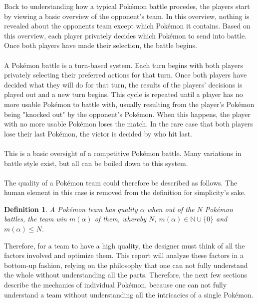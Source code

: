 \documentclass{article}
\newtheorem{definition}{Definition}
\begin{document}
Back to understanding how a typical Pok\'emon battle procedes, the players start by viewing a basic overview of the opponent's team. In this overview, nothing is revealed about the opponents team except which Pok\'emon it contains. Based on this overview, each player privately decides which Pok\'emon to send into battle. Once both players have made their selection, the battle begins.\\\\
A Pok\'emon battle is a turn-based system. Each turn begins with both players privately selecting their preferred actions for that turn. Once both players have decided what they will do for that turn, the results of the players' decisions is played out and a new turn begins. This cycle is repeated until a player has no more usable Pok\'emon to battle with, usually resulting from the player's Pok\'emon being "knocked out" by the opponent's Pok\'emon. When this happens, the player with no more usable Pok\'emon loses the match. In the rare case that both players lose their last Pok\'emon, the victor is decided by who hit last.\\\\
This is a basic oversight of a competitive Pok\'emon battle. Many variations in battle style exist, but all can be boiled down to this system.\\\\
The quality of a Pok\'emon team could therefore be described as follows. The human element in this case is removed from the definition for simplicity's sake.
\begin{definition}
A Pok\'emon team has quality $\alpha$ when out of the $N$ Pok\'emon battles, the team win $m(\alpha)$ of them, whereby $N$, $m(\alpha)\in\mathbb{N}\cup\{0\}$ and $m(\alpha)\le N$.
\end{definition}
Therefore, for a team to have a high quality, the designer must think of all the factors involved and optimize them. This report will analyze these factors in a bottom-up fashion, relying on the philosophy that one can not fully understand the whole without understanding all the parts. Therefore, the next few sections describe the mechanics of individual Pok\'emon, because one can not fully understand a team without understanding all the intricacies of a single Pok\'emon.
\end{document}
